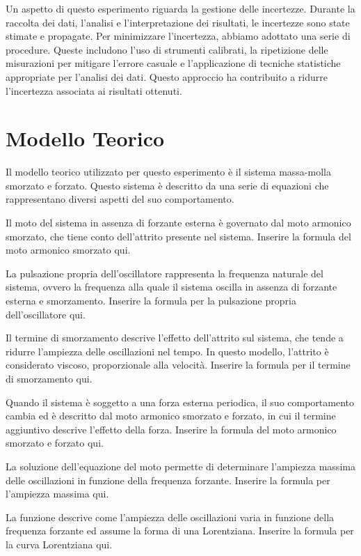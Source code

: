 \documentclass[12pt]{article}
\begin{document}
Un aspetto di questo esperimento riguarda la gestione delle incertezze. Durante la raccolta 
dei dati, l'analisi e l'interpretazione dei risultati, le incertezze sono state stimate e 
propagate. Per minimizzare l'incertezza, abbiamo adottato una serie di procedure. Queste 
includono l'uso di strumenti calibrati, la ripetizione delle misurazioni per mitigare l'errore 
casuale e l'applicazione di tecniche statistiche appropriate per l'analisi dei dati. Questo 
approccio ha contribuito a ridurre l'incertezza associata ai risultati ottenuti.

\section{Modello Teorico}
Il modello teorico utilizzato per questo esperimento è il sistema massa-molla smorzato e forzato.
Questo sistema è descritto da una serie di equazioni che rappresentano diversi aspetti del suo 
comportamento.

Il moto del sistema in assenza di forzante esterna è governato dal moto armonico smorzato, 
che tiene conto dell'attrito presente nel sistema. Inserire la formula del moto armonico smorzato qui.

La pulsazione propria dell'oscillatore rappresenta la frequenza naturale del sistema, 
ovvero la frequenza alla quale il sistema oscilla in assenza di forzante esterna e smorzamento. 
Inserire la formula per la pulsazione propria dell'oscillatore qui.

Il termine di smorzamento descrive l'effetto dell'attrito sul sistema, che tende a ridurre 
l'ampiezza delle oscillazioni nel tempo. In questo modello, l'attrito è considerato viscoso, 
proporzionale alla velocità. Inserire la formula per il termine di smorzamento qui.

Quando il sistema è soggetto a una forza esterna periodica, il suo comportamento cambia ed è 
descritto dal moto armonico smorzato e forzato, in cui il termine aggiuntivo descrive l'effetto 
della forza. Inserire la formula del moto armonico smorzato e forzato qui.

La soluzione dell'equazione del moto permette di determinare l'ampiezza massima delle 
oscillazioni in funzione della frequenza forzante. Inserire la formula per l'ampiezza massima qui.

La funzione descrive come l'ampiezza delle oscillazioni varia in funzione della frequenza 
forzante ed assume la forma di una Lorentziana. Inserire la formula per la curva Lorentziana qui.
\end{document}

